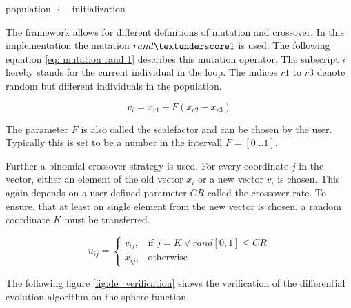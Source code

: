 \documentclass[./\jobname.tex]{subfiles}
\begin{document}
\begin{algorithm}
	\SetAlgoNoLine
	\DontPrintSemicolon
	population $\gets$ initialization\;
	\label{algo: DE}
\end{algorithm}

The framework allows for different definitions of mutation and crossover. In this implementation the mutation $rand\textunderscore1$ is used. The following equation \ref{eq: mutation rand 1} describes this mutation operator. The subscript $i$ hereby stands for the current individual in the loop. The indices $r1$ to $r3$ denote random but different individuals in the population. 

\begin{equation}
\label{eq: mutation rand 1}
v_i = x_{r1} + F (x_{r2} - x_{r3})
\end{equation}

The parameter $F$ is also called the scalefactor and can be chosen by the user. Typically this is set to be a number in the intervall $F = \left[ 0 ... 1 \right] $.

Further a binomial crossover strategy is used. For every coordinate $j$ in the vector, either an element of the old vector $x_i$ or a new vector $v_i$ is chosen. This again depends on a user defined parameter $CR$ called the crossover rate. To ensure, that at least on single element from the new vector is chosen, a random coordinate $K$ must be transferred. 

\begin{equation}
u_{ij}=\begin{cases}
v_{ij}, &\text{if $j = K \lor rand[0,1] \leq CR$}\\
x_{ij}, &\text{otherwise}
\end{cases}
\end{equation}

The following figure \ref{fig:de_verification} shows the verification of the differential evolution algorithm on the sphere function. 
\end{document}
